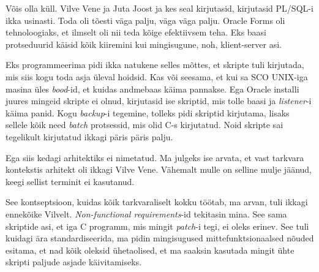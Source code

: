 
Võis olla küll. Vilve Vene ja Juta 
Joost ja kes seal kirjutasid, kirjutasid PL/SQL-i ikka 
usinasti. Toda oli tõesti väga palju, väga väga palju. Oracle Forms 
oli tehnoloogiaks, et ilmselt oli nii teda kõige efektiivsem teha. Eks 
 baasi protseduurid käisid kõik kiiremini kui mingisugune, noh, 
klient-server asi.


Eks programmeerima pidi ikka natukene selles mõttes, et skripte tuli kirjutada, 
mis  siis kogu toda asja üleval hoidsid. Kas või seesama, et kui sa SCO 
UNIX-iga masina üles \emph{bood}-id, et kuidas andmebaas käima pannakse. Ega 
 Oracle installi juures mingeid skripte ei olnud, kirjutasid ise 
 skriptid, mis tolle baasi ja \emph{listener}-i käima panid. Kogu 
\emph{backup}-i tegemine, tolleks pidi skriptid kirjutama, lisaks sellele kõik 
need \emph{batch} protsessid, mis olid C-s kirjutatud. 
Noid skripte  sai tegelikult kirjutatud ikkagi päris päris palju.


Ega siis kedagi arhitektiks ei nimetatud. Ma julgeks ise arvata, et vast 
tarkvara kontekstis arhitekt oli ikkagi Vilve Vene. 
Vähemalt  mulle on selline mulje jäänud, keegi sellist terminit ei kasutanud. 

See kontseptsioon, kuidas  kõik tarkvaraliselt kokku töötab, ma arvan, tuli 
ikkagi ennekõike Vilvelt. \emph{Non-functional requirements}-id tekitasin mina. 
See sama skriptide asi, et iga  C programm, mis mingit \emph{patch}-i tegi, ei 
oleks erinev. See tuli kuidagi ära standardiseerida,  ma pidin mingisugused  
mittefunktsionaalsed nõuded esitama, et nad kõik oleksid ühetaolised, et ma 
saaksin kasutada mingit ühte skripti paljude asjade käivitamiseks.


